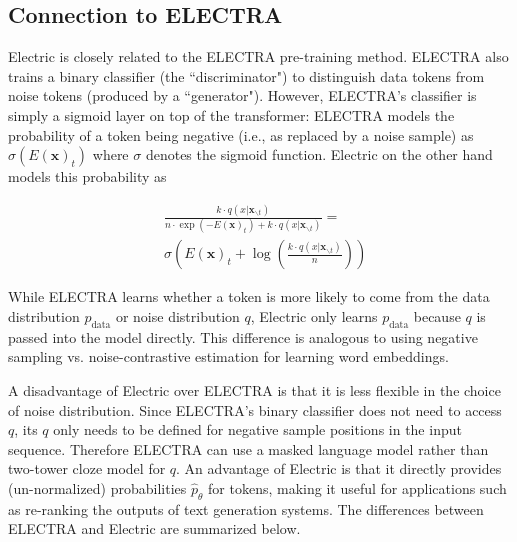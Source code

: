 \documentclass[11pt,a4paper]{article}
\newcommand{\alns}[1] {
	\begin{align*} #1 \end{align*}
}
\newcommand{\bx}{\bm{x}}
\newcommand{\cntxt}{\bx_{\backslash t}}
\newcommand{\up}{\hat{p}_\theta}
\newcommand{\pdata}{p_\text{data}}
\begin{document}
\subsection{Connection to ELECTRA}
Electric is closely related to the ELECTRA pre-training method. 
ELECTRA also trains a binary classifier (the ``discriminator") to distinguish data tokens from noise tokens (produced by a ``generator"). 
However, ELECTRA's classifier is simply a sigmoid layer on top of the transformer: ELECTRA models the probability of a token being negative (i.e., as replaced by a noise sample) as $\sigma(E(\bx)_t)$ where $\sigma$ denotes the sigmoid function.
Electric on the other hand models this probability as 
\alns{
&\frac{k \cdot q(x | \cntxt)}{n \cdot \exp{(-E(\bx)_t)} + k \cdot q(x | \cntxt)} =\\ &\sigma\left(E(\bx)_t + \log\left( \frac{k \cdot q(x | \cntxt)}{n} \right)\right)
}
While ELECTRA learns whether a token is more likely to come from the data distribution $\pdata$ or  noise distribution $q$, Electric only learns $\pdata$ because $q$ is passed into the model directly. This difference is analogous to using negative sampling \cite{Mikolov2013DistributedRO} vs. noise-contrastive estimation \cite{Mnih2013LearningWE} for learning word embeddings.

A disadvantage of Electric over ELECTRA is that it is less flexible in the choice of noise distribution. Since ELECTRA's binary classifier does not need to access $q$, its $q$ only needs to be defined for negative sample positions in the input sequence. Therefore ELECTRA can use a masked language model rather than two-tower cloze model for $q$.
An advantage of Electric is that it directly provides (un-normalized) probabilities $\up$ for tokens, making it useful for applications such as re-ranking the outputs of text generation systems.
The differences between ELECTRA and Electric are summarized below. \\
\vspace{-1.0mm}
\end{document}
